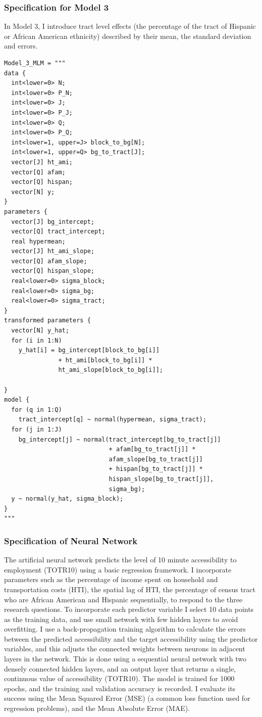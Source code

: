 \documentclass[a4paper,UKenglish]{lipics-v2018}
\begin{document}
\subsubsection{Specification for Model 3}
In Model 3, I introduce tract level effects (the percentage of the tract of Hispanic or African American ethnicity) described by their mean, the standard deviation and errors. 

\begin{lstlisting}[caption=Model 3 example]
Model_3_MLM = """
data {
  int<lower=0> N; 
  int<lower=0> P_N; 
  int<lower=0> J; 
  int<lower=0> P_J; 
  int<lower=0> Q; 
  int<lower=0> P_Q; 
  int<lower=1, upper=J> block_to_bg[N];
  int<lower=1, upper=Q> bg_to_tract[J];
  vector[J] ht_ami;
  vector[Q] afam;
  vector[Q] hispan;
  vector[N] y;
} 
parameters {
  vector[J] bg_intercept;
  vector[Q] tract_intercept;
  real hypermean;
  vector[J] ht_ami_slope;
  vector[Q] afam_slope;
  vector[Q] hispan_slope;
  real<lower=0> sigma_block;
  real<lower=0> sigma_bg;
  real<lower=0> sigma_tract;
}
transformed parameters {
  vector[N] y_hat;
  for (i in 1:N)
    y_hat[i] = bg_intercept[block_to_bg[i]] 
               + ht_ami[block_to_bg[i]] * 
               ht_ami_slope[block_to_bg[i]];
    
}
model {
  for (q in 1:Q)
    tract_intercept[q] ~ normal(hypermean, sigma_tract);
  for (j in 1:J)
    bg_intercept[j] ~ normal(tract_intercept[bg_to_tract[j]]
                             + afam[bg_to_tract[j]] * 
                             afam_slope[bg_to_tract[j]]
                             + hispan[bg_to_tract[j]] * 
                             hispan_slope[bg_to_tract[j]], 
                             sigma_bg);
  y ~ normal(y_hat, sigma_block);
}
"""
\end{lstlisting}

\subsubsection{Specification of Neural Network}
The artificial neural network predicts the level of 10 minute accessibility to employment (TOTR10) using a basic regression framework. I incorporate parameters such as the percentage of income spent on household and transportation costs (HTI), the spatial lag of HTI, the percentage of census tract who are African American and Hispanic sequentially, to respond to the three research questions. To incorporate each predictor variable I select 10 data points as the training data, and use small network with few hidden layers to avoid overfitting. I use a back-propagation training algorithm to calculate the errors between the predicted accessibility and the target accessibility using the predictor variables, and this adjusts the connected weights between neurons in adjacent layers in the network. This is done using a sequential neural network with two densely connected hidden layers, and an output layer that returns a single, continuous value of accessibility (TOTR10). The model is trained for 1000 epochs, and the training and validation accuracy is recorded. I evaluate its success using the Mean Squared Error (MSE) (a common loss function used for regression problems), and the Mean Absolute Error (MAE). 
\end{document}
